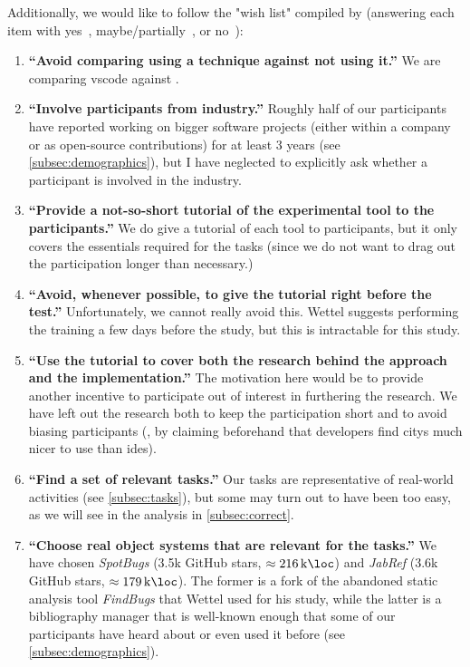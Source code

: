 \documentclass[../thesis]{subfiles}
\begin{document}
Additionally, we would like to follow the "wish list" compiled by \textcite[122--124]{wettel2011} (answering each item with yes~\cyes, maybe/partially~\chmm, or no~\cno):
\begin{enumerate}
	\item \textbf{\enquote{Avoid comparing using a technique against not using it.}}
	      We are comparing \gls{vscode} against \SEE{}. \cyes
	\item \textbf{\enquote{Involve participants from industry.}}
	      Roughly half of our participants have reported working on bigger software projects (either within a company or as open-source contributions) for at least 3 years (see \cref{subsec:demographics}), but I have neglected to explicitly ask whether a participant is involved in the industry. \chmm
	\item \textbf{\enquote{Provide a not-so-short tutorial of the experimental tool to the participants.}}
	      We do give a tutorial of each tool to participants, but it only covers the essentials required for the tasks (since we do not want to drag out the participation longer than necessary.) \chmm
	\item \textbf{\enquote{Avoid, whenever possible, to give the tutorial right before the test.}}
	      Unfortunately, we cannot really avoid this.
	      Wettel suggests performing the training a few days before the study, but this is intractable for this study. \cno
	\item \textbf{\enquote{Use the tutorial to cover both the research behind the approach and the implementation.}}
	      The motivation here would be to provide another incentive to participate out of interest in furthering the research.
	      We have left out the research both to keep the participation short and to avoid biasing participants (\eg, by claiming beforehand that developers find \glspl{city} much nicer to use than \glspl{ide}). \cno
	\item \textbf{\enquote{Find a set of relevant tasks.}}
	      Our tasks are representative of real-world activities (see \cref{subsec:tasks}), but some may turn out to have been too easy, as we will see in the analysis in \cref{subsec:correct}. \chmm
	\item \textbf{\enquote{Choose real object systems that are relevant for the tasks.}}
	      We have chosen \emph{SpotBugs} (\num{3.5}k GitHub stars, $\approx \qty{216}{\kilo\loc}$) and \emph{JabRef} (\num{3.6}k GitHub stars, $\approx \qty{179}{\kilo\loc}$).
	      The former is a fork of the abandoned static analysis tool \emph{FindBugs} that Wettel used for his study, while the latter is a bibliography manager that is well-known enough that some of our participants have heard about or even used it before (see \cref{subsec:demographics}).~\cyes

\end{enumerate}
\end{document}

